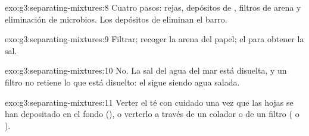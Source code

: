 \begin{solution}{exo:g3:separating-mixtures:8}
Cuatro pasos: rejas, depósitos de , filtros de arena y
eliminación de microbios. Los depósitos de  eliminan el
barro.
\end{solution}

\begin{solution}{exo:g3:separating-mixtures:9}
Filtrar; recoger la arena del papel;  el  para obtener
la sal.
\end{solution}

\begin{solution}{exo:g3:separating-mixtures:10}
No. La sal del agua del mar está disuelta, y un filtro no retiene lo
que está disuelto: el  sigue siendo agua salada.
\end{solution}

\begin{solution}{exo:g3:separating-mixtures:11}
Verter el té con cuidado una vez que las hojas se han depositado en el
fondo (), o verterlo a través de un colador o de un filtro
( o ).
\end{solution}
